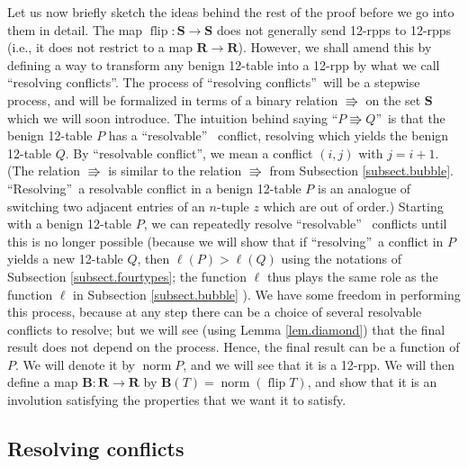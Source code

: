 \documentclass[numbers=enddot,12pt,final,onecolumn,notitlepage]{scrartcl}%
\theoremstyle{definition}
\begin{document}
Let us now briefly sketch the ideas behind the rest of the proof before we go
into them in detail. The map $\operatorname*{flip}:\mathbf{S}\rightarrow
\mathbf{S}$ does not generally send 12-rpps to 12-rpps (i.e., it does not
restrict to a map $\mathbf{R}\rightarrow\mathbf{R}$). However, we shall amend
this by defining a way to transform any benign 12-table into a 12-rpp by what
we call \textquotedblleft resolving conflicts\textquotedblright. The process
of \textquotedblleft resolving conflicts\textquotedblright\ will be a stepwise
process, and will be formalized in terms of a binary relation $\Rrightarrow$
on the set $\mathbf{S}$ which we will soon introduce. The intuition behind
saying \textquotedblleft$P\Rrightarrow Q$\textquotedblright\ is that the
benign 12-table $P$ has a \textquotedblleft resolvable\textquotedblright%
\ conflict, resolving which yields the benign 12-table $Q$. By
\textquotedblleft resolvable conflict\textquotedblright, we mean a conflict
$\left(  i,j\right)  $ with $j=i+1$. (The relation $\Rrightarrow$ is similar
to the relation $\Rrightarrow$ from Subsection \ref{subsect.bubble}.
\textquotedblleft Resolving\textquotedblright\ a resolvable conflict in a
benign 12-table $P$ is an analogue of switching two adjacent entries of an
$n$-tuple $z$ which are out of order.) Starting with a benign 12-table $P$, we
can repeatedly resolve \textquotedblleft resolvable\textquotedblright%
\ conflicts until this is no longer possible (because we will show that if
\textquotedblleft resolving\textquotedblright\ a conflict in $P$ yields a new
12-table $Q$, then $\ell\left(  P\right)  >\ell\left(  Q\right)  $ using the
notations of Subsection \ref{subsect.fourtypes}; the function $\ell$ thus
plays the same role as the function $\ell$ in Subsection \ref{subsect.bubble}%
). We have some freedom in performing this process, because at any step there
can be a choice of several resolvable conflicts to resolve; but we will see
(using Lemma \ref{lem.diamond}) that the final result does not depend on the
process. Hence, the final result can be a function of $P$. We will denote it
by $\operatorname*{norm}P$, and we will see that it is a 12-rpp. We will then
define a map $\mathbf{B}:\mathbf{R}\rightarrow\mathbf{R}$ by $\mathbf{B}%
\left(  T\right)  =\operatorname*{norm}\left(  \operatorname*{flip}T\right)
$, and show that it is an involution satisfying the properties that we want it
to satisfy.

\subsection{Resolving conflicts}
\end{document}
